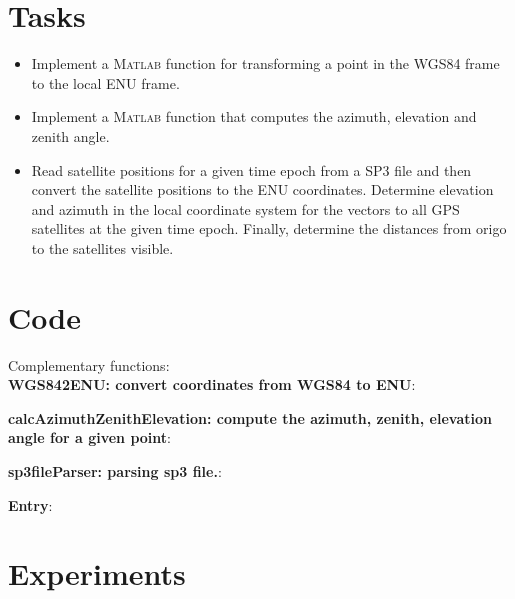 \section{Tasks}
\begin{itemize}
    \item Implement a \textsc{Matlab} function for transforming a point in the WGS84 frame to the local ENU frame.
	\item Implement a \textsc{Matlab} function that computes the azimuth, elevation and zenith angle.
	\item Read satellite positions for a given time epoch from a SP3 file and then convert the satellite positions to the ENU coordinates. Determine elevation and azimuth in the local coordinate system for the vectors to all GPS satellites at the given time epoch. Finally, determine the distances from origo to the satellites visible.
\end{itemize}
\section{Code}
Complementary functions: \\
\textbf{WGS842ENU: convert coordinates from WGS84 to ENU}:

\textbf{calcAzimuthZenithElevation: compute the azimuth, zenith, elevation angle for a given point}:

\textbf{sp3fileParser: parsing sp3 file.}:

\textbf{Entry}:

\section{Experiments}
